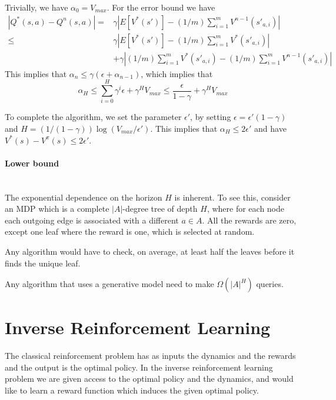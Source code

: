 Trivially, we have $\alpha_0=V_{max}$. For the error bound we have
\begin{align*}
|Q^*(s,a)-Q^n(s,a)|=&\gamma|E[V^*(s')]-(1/m)\sum_{i=1}^m
V^{n-1}(s'_{a,i})|\\
\leq &\gamma|E[V^*(s')]-(1/m)\sum_{i=1}^m V^{*}(s'_{a,i})|\\
&+\gamma|(1/m)\sum_{i=1}^m V^{*}(s'_{a,i})-(1/m)\sum_{i=1}^m
V^{n-1}(s'_{a,i})|
\end{align*}
This implies that $\alpha_n \leq \gamma(\epsilon+\alpha_{n-1})$,
which implies that
\[
\alpha_H\leq \sum_{i=0}^H \gamma^i \epsilon + \gamma^H V_{max}\leq
\frac{\epsilon}{1-\gamma}+\gamma^H V_{max}
\]

To complete the algorithm, we set the parameter $\epsilon'$, by
setting $\epsilon=\epsilon'(1-\gamma)$ and
$H=(1/(1-\gamma))\log(V_{max}/\epsilon')$. This implies that
$\alpha_H\leq 2\epsilon'$ and have $V^*(s)-V^\pi(s)\leq 2\epsilon'$.

\paragraph{Lower bound}\ \\

The exponential dependence on the horizon $H$ is inherent. To see
this, consider an MDP which is a complete $|A|$-degree tree of depth
$H$, where for each node each outgoing edge is associated with a
different $a\in A$. All the rewards are zero, except one leaf where
the reward is one, which is selected at random.

Any algorithm would have to check, on average, at least half the
leaves before it finds the unique leaf.

\begin{theorem}
Any algorithm that uses a generative model need to make
$\Omega(|A|^H)$ queries.
\end{theorem}




\section{Inverse Reinforcement Learning}

The classical reinforcement problem has as inputs the dynamics and
the rewards and the output is the optimal policy. In the inverse
reinforcement learning problem we are given access to the optimal
policy and the dynamics, and would like to learn a reward function
which induces the given optimal policy.

